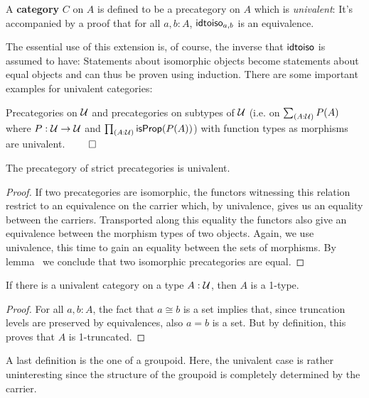 \begin{defn}[Category]
A \textbf{category} $C$ on $A$ is defined to be a precategory on $A$ which is
\emph{univalent}: It's accompanied
by a proof that for all $a, b : A$, $\mathsf{idtoiso}_{a,b}$ is an equivalence.
\end{defn}

The essential use of this extension is, of course, the inverse that $\mathsf{idtoiso}$
is assumed to have: Statements about isomorphic objects become statements about
equal objects and can thus be proven using induction. There are some important
examples for univalent categories:

\begin{lemma}
Precategories on $\mathcal{U}$ and 	precategories on subtypes of $\mathcal{U}$ (i.e. on
$\sum_{(A : \mathcal{U})} P(A)$ where $P : \mathcal{U} \to \mathcal{U}$ and $\prod_{(A : \mathcal{U})} \mathsf{isProp}(P(A))$)
with function types as morphisms are univalent. \hfill $\qed$
\end{lemma}

\begin{lemma} \label{thm:precat-univalent}
The precategory of strict precategories is univalent.
\end{lemma}

\begin{proof}
If two precategories are isomorphic, the functors witnessing this relation restrict
to an equivalence on the carrier which, by univalence, gives us an equality
between the carriers.
Transported along this equality the functors also give an equivalence between the
morphism types of two objects.
Again, we use univalence, this time to gain an equality between the sets of morphisms.
By lemma~\label{thm:hott-eq-precat} we conclude that two isomorphic precategories
are equal.
\end{proof}

\begin{lemma} \label{thm:cat-1-type}
If there is a univalent category on a type $A : \mathcal{U}$, then $A$ is a 1-type.
\end{lemma}

\begin{proof}
For all $a, b : A$, the fact that $a \cong b$ is a set implies that, since
truncation levels are preserved by equivalences, also $a = b$ is a set.
But by definition, this proves that $A$ is 1-truncated.
\end{proof}

A last definition is the one of a groupoid.
Here, the univalent case is rather uninteresting since the structure of the groupoid
is completely determined by the carrier. %

